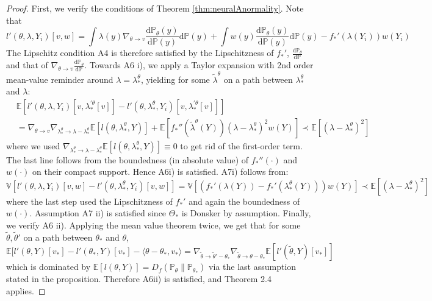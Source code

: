 \documentclass[12pt]{article}
\def\D{\mathrm{d}}
\theoremstyle{myplain}
\theoremstyle{definition}
\theoremstyle{definition}
\theoremstyle{remark}
\numberwithin{equation}{section}
\begin{document}
\begin{proof}
First, we verify the conditions of Theorem \ref{thm:neuralAnormality}.  Note that $$l'(\theta, \lambda, Y_i)[v, w]=\int \lambda(y)\nabla_{\theta\to v}\frac{\D\mathbb{P}_\theta(y)}{\D\mathbb{P}(y)}\D\mathbb{P}(y) + \int w(y) \frac{\D\mathbb{P}_\theta(y)}{\D\mathbb{P}(y)}\D\mathbb{P}(y) - f_*'(\lambda(Y_i))w(Y_i)$$
The Lipschitz condition A4 is therefore satisfied by the Lipschitzness of $f_*'$, $\frac{\D\mathbb{P}_\theta}{\D\mathbb{P}}$ and that of $\nabla_{\theta\to v}\frac{\D\mathbb{P}_\theta}{\D\mathbb{P}}$. Towards A6 i), we apply a Taylor expansion with 2nd order mean-value reminder around $\lambda=\lambda_*^\theta$, yielding for some $\widetilde{\lambda}^\theta$ on a path between $\lambda_*^\theta$ and $\lambda$:
\begin{align*}
    & \mathbb{E}[l'(\theta, \lambda, Y_i)[v, \lambda_*^{\prime\theta}[v]]-l'(\theta, \lambda_*^\theta, Y_i)[v, \lambda_*^{\prime\theta}[v]]]\\
    &=\nabla_{\theta\to v}\nabla_{\lambda_*^\theta\to\lambda-\lambda_*^\theta}\mathbb{E}[l(\theta, \lambda_*^\theta, Y)] + \mathbb{E}[f_*''(\widetilde{\lambda}^\theta(Y))(\lambda-\lambda_*^\theta)^2w(Y)] \prec \mathbb{E}[(\lambda-\lambda_*^\theta)^2]
\end{align*}
where we used $\nabla_{\lambda_*^\theta\to\lambda-\lambda_*^\theta}\mathbb{E}[l(\theta, \lambda_*^\theta, Y)]\equiv 0$ to get rid of the first-order term. The last line follows from the boundedness (in absolute value) of $f_*''(\cdot)$ and $w(\cdot)$ on their compact support. Hence A6i) is satisfied. A7i) follows from:
$$\mathbb{V}[l'(\theta, \lambda, Y_i)[v, w]-l'(\theta, \lambda_*^\theta, Y_i)[v, w]]=\mathbb{V}[(f_*'(\lambda(Y))-f_*'(\lambda_*^\theta(Y)))w(Y)]\prec\mathbb{E}[(\lambda-\lambda_*^\theta)^2]$$
where the last step used the Lipschitzness of $f_*'$ and again the boundedness of $w(\cdot)$. Assumption A7 ii) is satisfied since $\mathcal{\Theta}_*$ is Donsker by assumption. Finally, we verify A6 ii). Applying the mean value theorem twice, we get that for some $\widetilde\theta, \widetilde\theta'$ on a path between $\theta_*$ and $\theta$, $\mathbb{E}[l'(\theta, Y)[v_*]-l'(\theta_*, Y)[v_*] -  \langle \theta-\theta_* , v_*\rangle = \nabla_{\widetilde\theta \to \widetilde\theta'-\theta_*}\nabla_{\widetilde\theta \to \theta-\theta_*} \mathbb{E}[l'(\widetilde\theta, Y)[v_*]]$ which is dominated by $\mathbb{E}[l(\theta, Y)]=D_f(\mathbb{P}_\theta \|\mathbb{P}_{\theta_*})$ via the last assumption stated in the proposition. Therefore A6ii) is satisfied, and Theorem 2.4 applies.
\end{proof}
\end{document}
